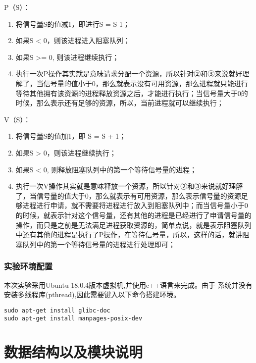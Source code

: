 \documentclass[withoutpreface,bwprint]{cumcmthesis} %
\begin{document}
P（S）：
\begin{enumerate}[itemindent=2em]  %
    \item 将信号量S的值减1，即进行S = S-1；
    \item 如果S < 0，则该进程进入阻塞队列；
    \item 如果S >= 0, 则该进程继续执行；
    \item 执行一次P操作其实就是意味请求分配一个资源，所以针对②和③来说就好理解了，当信号量的值小于0，那么就表示没有可用资源，那么进程就只能进行等待其他拥有该资源的进程释放资源之后，才能进行执行；当信号量大于0的时候，那么表示还有足够的资源，所以，当前进程就可以继续执行；

\end{enumerate}
         
V（S）：
\begin{enumerate}[itemindent=2em]  %
\item 将信号量S的值加1，即 S = S + 1； 
\item 如果S > 0，则该进程继续执行；	   
\item 如果S < 0, 则释放阻塞队列中的第一个等待信号量的进程；
\item 执行一次V操作其实就是意味释放一个资源，所以针对②和③来说就好理解了，当信号量的值大于0，那么就表示有可用资源，那么表示信号量的资源足够进程进行申请，就不需要将进程进行放入到阻塞队列中；而当信号量小于0的时候，就表示针对这个信号量，还有其他的进程是已经进行了申请信号量的操作，而只是之前是无法满足进程获取资源的，简单点说，就是表示阻塞队列中还有其他的进程是执行了P操作，在等待信号量，所以，这样的话，就讲阻塞队列中的第一个等待信号量的进程进行处理即可；
\end{enumerate}


\subsubsection{实验环境配置}

本次实验采用Ubuntu 18.0.4版本虚拟机,并使用c++语言来完成。由于
系统并没有安装多线程库(pthread),因此需要键入以下命令搭建环境。

\begin{lstlisting}
sudo apt-get install glibc-doc
sudo apt-get install manpages-posix-dev
\end{lstlisting}

\section{数据结构以及模块说明}
\end{document}
